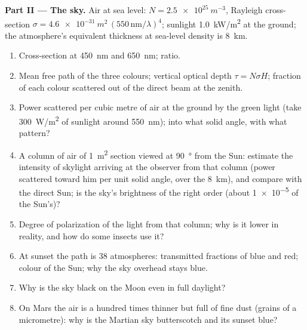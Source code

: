 \begin{problem}
\medskip
\noindent\textbf{Part II --- The sky.}
Air at sea level: $N = \qty{2.5e25}{m^{-3}}$, Rayleigh cross-section $\sigma =
\qty{4.6e-31}{m^2}\,(550\,\text{nm}/\lambda)^4$; sunlight \qty{1.0}{kW/m^2} at the
ground; the atmosphere's equivalent thickness at sea-level density is
\qty{8}{km}.
\begin{enumerate}[resume]
  \item Cross-section at \qty{450}{nm} and \qty{650}{nm}; ratio.
  \item Mean free path of the three colours; vertical optical depth
        $\tau = N\sigma H$; fraction of each colour scattered out of the
        direct beam at the zenith.
  \item Power scattered per cubic metre of air at the ground by the
        green light (take \qty{300}{W/m^2} of sunlight around
        \qty{550}{nm}); into what solid angle, with what pattern?
  \item A column of air of \qty{1}{m^2} section viewed at \qty{90}{\degree} from
        the Sun: estimate the intensity of skylight arriving at the
        observer from that column (power scattered toward him per
        unit solid angle, over the \qty{8}{km}), and compare with the
        direct Sun; is the sky's brightness of the right order
        (about \qty{1e-5}{} of the Sun's)?
  \item Degree of polarization of the light from that column; why is
        it lower in reality, and how do some insects use it?
  \item At sunset the path is $38$ atmospheres: transmitted fractions
        of blue and red; colour of the Sun; why the sky overhead stays
        blue.
  \item Why is the sky black on the Moon even in full daylight?
  \item On Mars the air is a hundred times thinner but full of fine
        dust (grains of a micrometre): why is the Martian sky
        butterscotch and its sunset blue?
\end{enumerate}


\end{problem}
